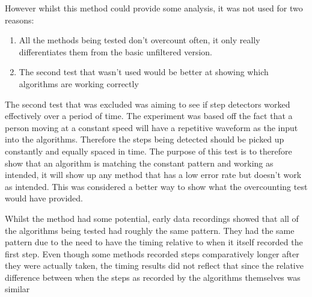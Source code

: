 \documentclass[main.tex]{subfiles}
\begin{document}
However whilst this method could provide some analysis, it was not used for two reasons:

\begin{enumerate}
	\item All the methods being tested don't overcount often, it only really differentiates them from the basic unfiltered version.
	\item The second test that wasn't used would be better at showing which algorithms are working correctly
\end{enumerate}

The second test that was excluded was aiming to see if step detectors worked effectively over a period of time. The experiment was based off the fact that a person moving at a constant speed will have a repetitive waveform as the input into the algorithms. Therefore the steps being detected should be picked up constantly and equally spaced in time. The purpose of this test is to therefore show that an algorithm is matching the constant pattern and working as intended, it will show up any method that has a low error rate but doesn't work as intended. This was considered a better way to show what the overcounting test would have provided.

Whilst the method had some potential, early data recordings showed that all of the algorithms being tested had roughly the same pattern. They had the same pattern due to the need to have the timing relative to when it itself recorded the first step. Even though some methods recorded steps comparatively longer after they were actually taken, the timing results did not reflect that since the relative difference between when the steps as recorded by the algorithms themselves was similar
\end{document}
